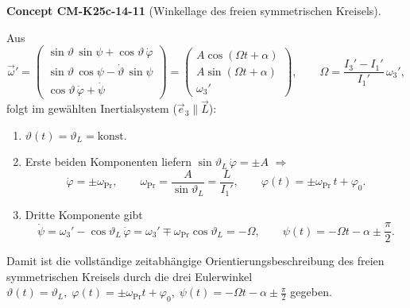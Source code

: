 \documentclass[10pt, letterpaper]{article}
\newcommand{\CustomHeading}[3]{%
  \par\medskip\noindent%
  \textbf{#1 #2} \textnormal{(#3)}.\enskip%
}
\newenvironment{CONC}[2]{\CustomHeading{Concept}{#1}{#2}}{}
\begin{document}
\begin{CONC}{CM-K25c-14-11}{Winkellage des freien symmetrischen Kreisels}
Aus
\[
\vec\omega'
=
\begin{pmatrix}
\sin\vartheta\,\sin\psi+\cos\vartheta\,\dot\varphi\\[2pt]
\sin\vartheta\,\cos\psi-\dot\vartheta\,\sin\psi\\[2pt]
\cos\vartheta\,\dot\varphi+\dot\psi
\end{pmatrix}
=
\begin{pmatrix}
A\cos(\Omega t+\alpha)\\
A\sin(\Omega t+\alpha)\\
\omega_3'
\end{pmatrix},
\qquad
\Omega=\frac{I_3'-I_1'}{I_1'}\,\omega_3',
\]
folgt im gewählt­en Inertialsystem ($\vec e_3\parallel\vec L$):

\begin{enumerate}
\item \(\vartheta(t)=\vartheta_L=\text{konst}\).

\item Erste beiden Komponenten liefern  
      \(\sin\vartheta_L\,\dot\varphi=\pm A\)  
      \(\Longrightarrow\)
      \[
        \dot\varphi=\pm\omega_{\text{Pr}}\!,
        \qquad
        \omega_{\text{Pr}}=\frac{A}{\sin\vartheta_L}
                          =\frac{L}{I_1'},
        \qquad
        \varphi(t)=\pm\omega_{\text{Pr}}\,t+\varphi_0 .
      \]

\item Dritte Komponente gibt  
      \[
        \dot\psi
        =\omega_3'-\cos\vartheta_L\,\dot\varphi
        =\omega_3'\mp\omega_{\text{Pr}}\cos\vartheta_L
        =-\Omega,
        \qquad
        \psi(t)=-\Omega t-\alpha\pm\frac{\pi}{2}.
      \]
\end{enumerate}

Damit ist die vollständige zeitabhängige Orientierungsbeschreibung des freien symmetrischen Kreisels durch die drei Eulerwinkel
\(
  \vartheta(t)=\vartheta_L,\;
  \varphi(t)=\pm\omega_{\text{Pr}}t+\varphi_0,\;
  \psi(t)=-\Omega t-\alpha\pm\frac{\pi}{2}
\)
gegeben.
\end{CONC}
\end{document}

